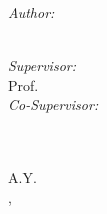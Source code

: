 \begin{titlingpage}
\begin{center}
		\vspace{1cm} %
		{\Huge{\bfseries{\textcolor{SchoolColor}{\Title}}} \par}\vspace{0.7cm} %
		\vspace{2cm} %

		\begin{minipage}[t]{0.4\textwidth}
			\begin{flushleft} \large
				\emph{Author:}\\
				\textcolor{SchoolColor}{\AuthorName \ \textsc{\AuthorSurname}} %
			\end{flushleft}
		\end{minipage}
		\begin{minipage}[t]{0.4\textwidth}
			\begin{flushright} \large
				\emph{Supervisor:} \\
				\textcolor{SchoolColor}{Prof. \SupName \ \textsc{\SupSurname}} %
				\vspace{10pt}\\
				\emph{Co-Supervisor:} \\
				\textcolor{SchoolColor}{\CosupName \ \textsc{\CosupSurname}} %
			\end{flushright}
		\end{minipage}\\[4.35cm]
		{\large A.Y. \AcademicYear}\\[0.2cm]
		{\large \UnivPlace, \Date}\\[8cm]
		\vfill
		\vfill
	\end{center}
\end{titlingpage}
